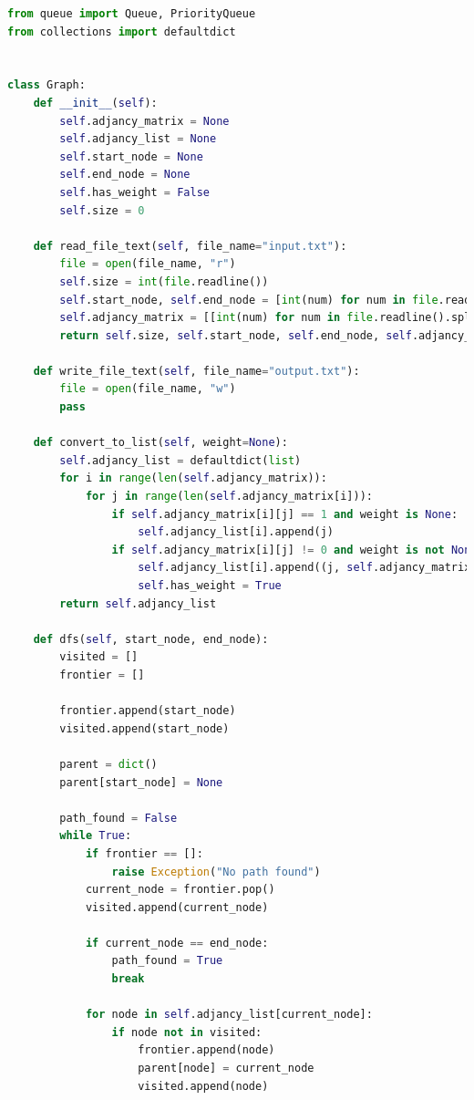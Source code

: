 \documentclass[a4paper, 11pt]{article}
\begin{document}
\begin{lstlisting}[language=Python]
from queue import Queue, PriorityQueue
from collections import defaultdict


class Graph:
    def __init__(self):
        self.adjancy_matrix = None
        self.adjancy_list = None
        self.start_node = None
        self.end_node = None
        self.has_weight = False
        self.size = 0

    def read_file_text(self, file_name="input.txt"):
        file = open(file_name, "r")
        self.size = int(file.readline())
        self.start_node, self.end_node = [int(num) for num in file.readline().split(' ')]
        self.adjancy_matrix = [[int(num) for num in file.readline().split(' ')] for num in range(self.size)]
        return self.size, self.start_node, self.end_node, self.adjancy_matrix

    def write_file_text(self, file_name="output.txt"):
        file = open(file_name, "w")
        pass

    def convert_to_list(self, weight=None):
        self.adjancy_list = defaultdict(list)
        for i in range(len(self.adjancy_matrix)):
            for j in range(len(self.adjancy_matrix[i])):
                if self.adjancy_matrix[i][j] == 1 and weight is None:
                    self.adjancy_list[i].append(j)
                if self.adjancy_matrix[i][j] != 0 and weight is not None:
                    self.adjancy_list[i].append((j, self.adjancy_matrix[i][j]))
                    self.has_weight = True
        return self.adjancy_list

    def dfs(self, start_node, end_node):
        visited = []
        frontier = []

        frontier.append(start_node)
        visited.append(start_node)

        parent = dict()
        parent[start_node] = None

        path_found = False
        while True:
            if frontier == []:
                raise Exception("No path found")
            current_node = frontier.pop()
            visited.append(current_node)

            if current_node == end_node:
                path_found = True
                break

            for node in self.adjancy_list[current_node]:
                if node not in visited:
                    frontier.append(node)
                    parent[node] = current_node
                    visited.append(node)


\end{lstlisting}
\end{document}
